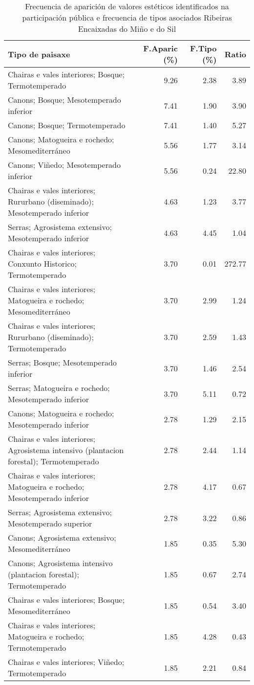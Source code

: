 \begin{table}[p]
\centering
\caption{Frecuencia de aparición de valores estéticos identificados na participación pública e frecuencia de tipos asociados Ribeiras Encaixadas do Miño e do Sil} 
\label{vsixotest4}
\begin{tabular}{lrrr}
  \hline
Tipo de paisaxe & F.Aparic (\%) & F.Tipo (\%) & Ratio \\ 
  \hline
Chairas e vales interiores; Bosque; Termotemperado & 9.26 & 2.38 & 3.89 \\ 
  Canons; Bosque; Mesotemperado inferior & 7.41 & 1.90 & 3.90 \\ 
  Canons; Bosque; Termotemperado & 7.41 & 1.40 & 5.27 \\ 
  Canons; Matogueira e rochedo; Mesomediterráneo & 5.56 & 1.77 & 3.14 \\ 
  Canons; Viñedo; Mesotemperado inferior & 5.56 & 0.24 & 22.80 \\ 
  Chairas e vales interiores; Rururbano (diseminado); Mesotemperado inferior & 4.63 & 1.23 & 3.77 \\ 
  Serras; Agrosistema extensivo; Mesotemperado inferior & 4.63 & 4.45 & 1.04 \\ 
  Chairas e vales interiores; Conxunto Historico; Termotemperado & 3.70 & 0.01 & 272.77 \\ 
  Chairas e vales interiores; Matogueira e rochedo; Mesomediterráneo & 3.70 & 2.99 & 1.24 \\ 
  Chairas e vales interiores; Rururbano (diseminado); Termotemperado & 3.70 & 2.59 & 1.43 \\ 
  Serras; Bosque; Mesotemperado inferior & 3.70 & 1.46 & 2.54 \\ 
  Serras; Matogueira e rochedo; Mesotemperado inferior & 3.70 & 5.11 & 0.72 \\ 
  Canons; Matogueira e rochedo; Mesotemperado inferior & 2.78 & 1.29 & 2.15 \\ 
  Chairas e vales interiores; Agrosistema intensivo (plantacion forestal); Termotemperado & 2.78 & 2.44 & 1.14 \\ 
  Chairas e vales interiores; Matogueira e rochedo; Mesotemperado inferior & 2.78 & 4.17 & 0.67 \\ 
  Serras; Agrosistema extensivo; Mesotemperado superior & 2.78 & 3.22 & 0.86 \\ 
  Canons; Agrosistema extensivo; Mesomediterráneo & 1.85 & 0.35 & 5.30 \\ 
  Canons; Agrosistema intensivo (plantacion forestal); Termotemperado & 1.85 & 0.67 & 2.74 \\ 
  Chairas e vales interiores; Bosque; Mesomediterráneo & 1.85 & 0.54 & 3.40 \\ 
  Chairas e vales interiores; Matogueira e rochedo; Termotemperado & 1.85 & 4.28 & 0.43 \\ 
  Chairas e vales interiores; Viñedo; Termotemperado & 1.85 & 2.21 & 0.84 \\ 
   \hline
\end{tabular}
\end{table}
